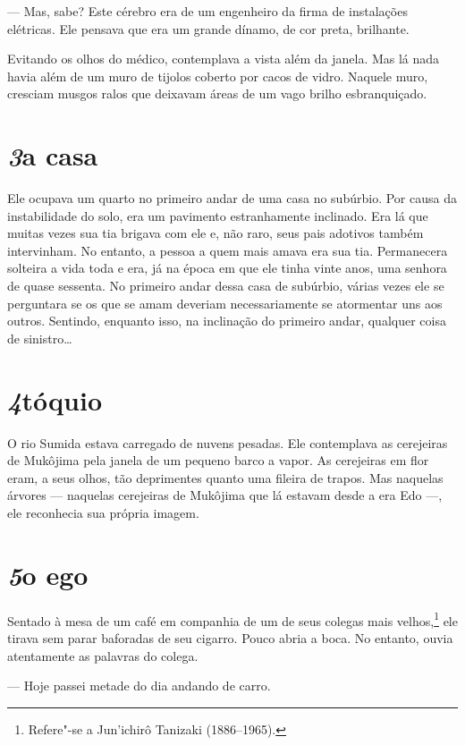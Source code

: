 --- Mas, sabe? Este cérebro era de um engenheiro da firma de instalações
elétricas. Ele pensava que era um grande dínamo, de cor preta, brilhante.

Evitando os olhos do médico, contemplava a vista além da janela. Mas lá
nada havia além de um muro de tijolos coberto por cacos de vidro.
Naquele muro, cresciam musgos ralos que deixavam áreas de um vago
brilho esbranquiçado.

\section*{\textit{3}\es a casa}

Ele ocupava um quarto no primeiro andar de uma casa no subúrbio. Por
causa da instabilidade do solo, era um pavimento estranhamente
inclinado. Era lá que muitas vezes sua tia brigava com ele e, não raro,
seus pais adotivos também intervinham. No entanto, a pessoa a quem mais
amava era sua tia. Permanecera solteira a vida toda e era, já na época
em que ele tinha vinte anos, uma senhora de quase sessenta. No primeiro
andar dessa casa de subúrbio, várias vezes ele se perguntara se os que
se amam deveriam necessariamente se atormentar uns aos outros.
Sentindo, enquanto isso, na inclinação do primeiro andar, qualquer
coisa de sinistro\ldots{}

\section*{\textit{4}\es tóquio}

O rio Sumida estava carregado de nuvens pesadas. Ele contemplava as
cerejeiras de Mukôjima pela janela de um pequeno barco a vapor. As
cerejeiras em flor eram, a seus olhos, tão deprimentes quanto uma
fileira de trapos. Mas naquelas árvores --- naquelas cerejeiras de
Mukôjima que lá estavam desde a era Edo ---, ele reconhecia sua própria
imagem.

\section*{\textit{5}\es o ego}

Sentado à mesa de um café em companhia de um de seus colegas mais
velhos,\footnote{ Refere"-se a Jun'ichirô Tanizaki (1886--1965).} ele
tirava sem parar baforadas de seu cigarro. Pouco abria a boca. No
entanto, ouvia atentamente as palavras do colega.

--- Hoje passei metade do dia andando de carro.

